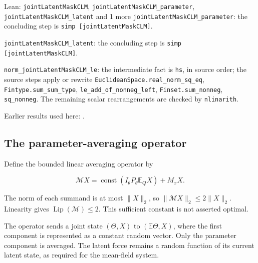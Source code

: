 \documentclass[11pt,a4paper]{report}
\begin{document}
\begin{leanbox}{Lean: \texttt{jointLatentMaskCLM}, \texttt{jointLatentMaskCLM\_\allowbreak{}parameter}, \texttt{jointLatentMaskCLM\_\allowbreak{}latent} and 1 more}
\texttt{joint\allowbreak{}Latent\allowbreak{}Mask\allowbreak{}CLM\_\allowbreak{}parameter}: the concluding step is \texttt{simp [joint\allowbreak{}Latent\allowbreak{}Mask\allowbreak{}CLM]}.



\texttt{joint\allowbreak{}Latent\allowbreak{}Mask\allowbreak{}CLM\_\allowbreak{}latent}: the concluding step is \texttt{simp [joint\allowbreak{}Latent\allowbreak{}Mask\allowbreak{}CLM]}.



\texttt{norm\_\allowbreak{}joint\allowbreak{}Latent\allowbreak{}Mask\allowbreak{}CLM\_\allowbreak{}le}: the intermediate fact is \texttt{hs}, in source order; the source steps apply or rewrite \texttt{Euclidean\allowbreak{}Space.\allowbreak{}real\_\allowbreak{}norm\_\allowbreak{}sq\_\allowbreak{}eq}, \texttt{Fintype.\allowbreak{}sum\_\allowbreak{}sum\_\allowbreak{}type}, \texttt{le\_\allowbreak{}add\_\allowbreak{}of\_\allowbreak{}nonneg\_\allowbreak{}left}, \texttt{Finset.\allowbreak{}sum\_\allowbreak{}nonneg}, \texttt{sq\_\allowbreak{}nonneg}. The remaining scalar rearrangements are checked by \texttt{nlinarith}.
\end{leanbox}


Earlier results used here: \cite[Section~3.1.1]{LangevinLean2026IPLA}.
\subsection{\texorpdfstring{The parameter-averaging operator}{The parameter-averaging operator}}
\label{report-step-ProximalLangevin-MeanFieldProcess-lean-4}


Define the bounded linear averaging operator by

\[\mathcal M X=\operatorname{const}(I_\theta P_\theta\mathbb E_QX)+M_xX.\]

The norm of each summand is at most \(\|X\|_2\), so \(\|\mathcal M X\|_2\le2\|X\|_2\). Linearity gives \(\operatorname{Lip}(\mathcal M)\le2\). This sufficient constant is not asserted optimal.



The operator sends a joint state \((\Theta,X)\) to \((\mathbb E\Theta,X)\), where the first component is represented as a constant random vector. Only the parameter component is averaged. The latent force remains a random function of its current latent state, as required for the mean-field system.
\end{document}
